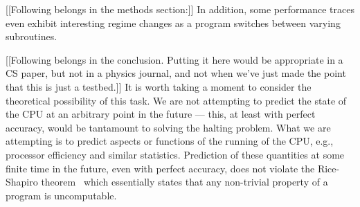 [[Following belongs in the methods section:]] In addition, some
performance traces even exhibit interesting regime changes as a
program switches between varying subroutines. 

[[Following belongs in the conclusion.  Putting it here would be
    appropriate in a CS paper, but not in a physics journal, and not
    when we've just made the point that this is just a testbed.]] 
It is worth taking a moment to consider the theoretical possibility of
this task. We are not attempting to predict the state of the CPU at an
arbitrary point in the future --- this, at least with perfect
accuracy, would be tantamount to solving the halting problem. What we
are attempting is to predict aspects or functions of the running of
the CPU, e.g., processor efficiency and similar statistics. Prediction
of these quantities at some finite time in the future, even with
perfect accuracy, does not violate the Rice-Shapiro
theorem~\cite{hopcroft2007} which essentially states that any non-trivial
property of a program is uncomputable.

